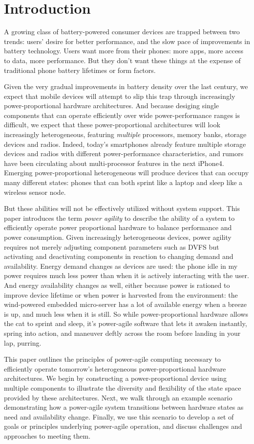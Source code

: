 \section{Introduction}

A growing class of battery-powered consumer devices are trapped between two
trends: users' desire for better performance, and the slow pace of
improvements in battery technology. Users want more from their phones: more
apps, more access to data, more performance. But they don't want these things
at the expense of traditional phone battery lifetimes or form factors.

Given the very gradual improvements in battery density over the last century,
we expect that mobile devices will attempt to slip this trap through
increasingly power-proportional hardware architectures. And because desiging
single components that can operate efficiently over wide power-performance
ranges is difficult, we expect that these power-proportional architectures
will look increasingly heterogeneous, featuring \textit{multiple} processors,
memory banks, storage devices and radios. Indeed, today's smartphones already
feature multiple storage devices and radios with different power-performance
characteristics, and rumors have been circulating about multi-processor
features in the next iPhone4. Emerging power-proportional heterogeneous will
produce devices that can occupy many different states: phones that can both
sprint like a laptop and sleep like a wireless sensor node.

But these abilities will not be effectively utilized without system support.
This paper introduces the term \textit{power agility} to describe the ability
of a system to efficiently operate power proportional hardware to balance
performance and power consumption. Given increasingly heterogeneous devices,
power agility requires not merely adjusting component parameters such as DVFS
but activating and deactivating components in reaction to changing demand and
availability. Energy demand changes as devices are used: the phone idle in my
power requires much less power than when it is actively interacting with the
user. And energy availability changes as well, either because power is
rationed to improve device lifetime or when power is harvested from the
environment: the wind-powered embedded micro-server has a lot of available
energy when a breeze is up, and much less when it is still. So while
power-proportional hardware allows the cat to sprint and sleep, it's
power-agile software that lets it awaken instantly, spring into action, and
maneuver deftly across the room before landing in your lap, purring.

This paper outlines the principles of power-agile computing necessary to
efficiently operate tomorrow's heterogeneous power-proportional hardware
architectures. We begin by constructing a power-proportional device using
multiple components to illustrate the diversity and flexibility of the state
space provided by these architectures. Next, we walk through an example
scenario demonstrating how a power-agile system transitions between hardware
states as need and availability change. Finally, we use this scenario to
develop a set of goals or principles underlying power-agile operation, and
discuss challenges and approaches to meeting them.
